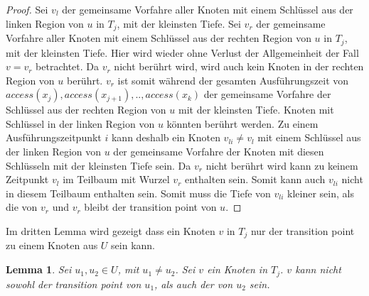 \documentclass[a4paper,12pt]{article}
\begin{document}
\begin{proof}
 Sei $v_l$ der gemeinsame Vorfahre aller Knoten mit einem Schlüssel aus der linken Region von $u$ in $T_j$, mit der kleinsten Tiefe. Sei $v_r$ der gemeinsame Vorfahre aller Knoten mit einem Schlüssel aus der rechten Region von $u$ in $T_j$, mit der kleinsten Tiefe. Hier wird wieder ohne Verlust der Allgemeinheit der Fall $v = v_r$ betrachtet. Da $v_r$ nicht berührt wird, wird auch kein Knoten in der rechten Region von $u$ berührt. $v_r$ ist somit während der gesamten Ausführungszeit von $\textit{access}\left(x_j\right),\textit{access}\left(x_{j+1}\right),..,\textit{access}\left(x_k\right)$  der gemeinsame Vorfahre der Schlüssel aus der rechten Region von $u$ mit der kleinsten Tiefe. Knoten mit Schlüssel in der linken Region von $u$ könnten berührt werden. Zu einem Ausführungszeitpunkt $i$ kann deshalb ein Knoten $v_{li} \ne v_l$ mit einem Schlüssel aus der linken Region von $u$ der gemeinsame Vorfahre der Knoten mit diesen Schlüsseln mit der kleinsten Tiefe sein. Da $v_r$ nicht berührt wird kann zu keinem Zeitpunkt $v_l$ im Teilbaum mit Wurzel $v_r$ enthalten sein. Somit kann auch $v_{li}$ nicht in diesem Teilbaum enthalten sein. Somit muss die Tiefe von  $v_{li}$ kleiner sein, als die von $v_r$ und $v_r$ bleibt der transition point von $u$. 
\end{proof}

Im dritten Lemma wird gezeigt dass ein Knoten $v$ in $T_j$ nur der transition point zu einem Knoten aus $U$ sein kann.

\newtheorem{Lemma6}{Lemma}[section] \label{lemmaDemaine3}
\begin{Lemma6} \label{demaineLemma2}
	Sei $u_1, u_2 \in U$, mit $u_1 \ne u_2$.  Sei $v$ ein Knoten in $T_j$. $v$ kann nicht sowohl der transition point von $u_1$, als auch der von $u_2$ sein.
\end{Lemma6}
\end{document}
